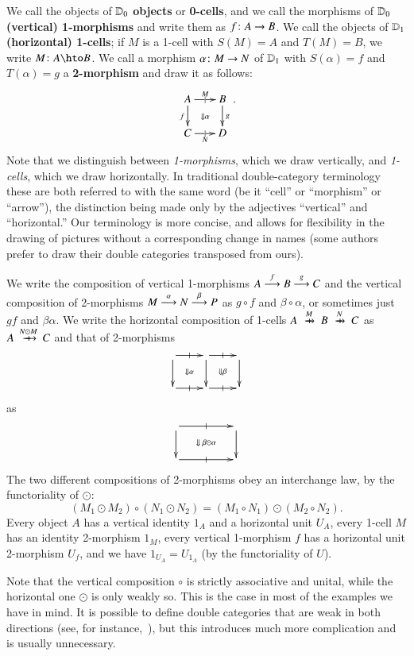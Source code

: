 We call the objects of $\lD_0$ \textbf{objects} or \textbf{0-cells},
and we call the morphisms of $\lD_0$ \textbf{(vertical) 1-morphisms}
and write them as $f\maps A\to B$.  We call the objects of $\lD_1$
\textbf{(horizontal) 1-cells}; if $M$ is a 1-cell with $S(M)=A$ and
$T(M)=B$, we write $M\maps A\hto B$.  We call a morphism $\alpha\maps
M\to N$ of $\lD_1$ with $S(\alpha)=f$ and $T(\alpha)=g$ a
\textbf{2-morphism} and draw it as follows:
\begin{equation}\label{eq:square}
  \xymatrix@-.5pc{
    A \ar[r]|{|}^{M}  \ar[d]_f \ar@{}[dr]|{\Downarrow\alpha}&
    B\ar[d]^g\\
    C \ar[r]|{|}_N & D
  }.
\end{equation}
Note that we distinguish between \emph{1-morphisms}, which we draw
vertically, and \emph{1-cells}, which we draw horizontally.  In
traditional double-category terminology these are both referred to
with the same word (be it ``cell'' or ``morphism'' or ``arrow''), the
distinction being made only by the adjectives ``vertical'' and
``horizontal.''  Our terminology is more concise, and allows for
flexibility in the drawing of pictures without a corresponding change
in names (some authors prefer to draw their double categories
transposed from ours).

We write the composition of vertical 1-morphisms $A\too[f] B\too[g] C$
and the vertical composition of 2-morphisms $M\too[\alpha]
N\too[\beta] P$ as $g\circ f$ and $\beta\circ\alpha$, or sometimes
just $gf$ and $\beta\alpha$.  We write the horizontal composition of
1-cells $A\xhto{M} B \xhto{N} C$ as $A\xhto{N\odot M} C$ and that of
2-morphisms
\[\vcenter{\xymatrix{ \ar[r]|-@{|}^-{} \ar[d] \ar@{}[dr]|{\Downarrow\alpha} &
     \ar[r]|-@{|}^-{} \ar[d] \ar@{}[dr]|{\Downarrow\beta} &\ar[d]\\
  \ar[r]|-@{|}_-{} & \ar[r]|-@{|}_-{} & }}\]
as
\[\vcenter{\xymatrix@C=4pc{ \ar[r]|-@{|}^-{} \ar[d] \ar@{}[dr]|{\Downarrow\;\be\odot\al} &  \ar[d]\\
  \ar[r]|-@{|}_-{} & }}\]
The two different compositions of 2-morphisms obey an interchange law,
by the functoriality of $\odot$:
\[(M_1\odot M_2) \circ (N_1\odot N_2) = (M_1\circ N_1)\odot (M_2\circ N_2).
\]
Every object $A$ has a vertical identity $1_A$ and a horizontal unit
$U_A$, every 1-cell $M$ has an identity 2-morphism $1_M$, every
vertical 1-morphism $f$ has a horizontal unit 2-morphism $U_f$, and we
have $1_{U_A} = U_{1_A}$ (by the functoriality of $U$).

Note that the vertical composition $\circ$ is strictly associative and
unital, while the horizontal one $\odot$ is only weakly so.  This is
the case in most of the examples we have in mind.  It is possible to
define double categories that are weak in both directions (see, for
instance,~\cite{verity:base-change}), but this introduces much more
complication and is usually unnecessary.

